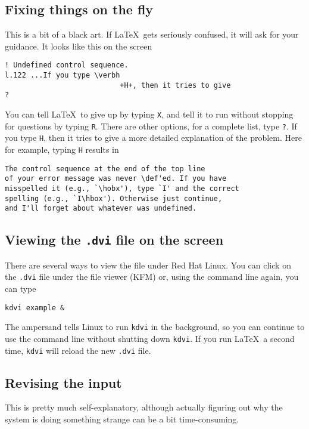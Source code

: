 \documentclass[12pt]{article}
\newcommand{\latex}{\LaTeX\ }
\begin{document}
\subsection{Fixing things on the fly}

This is a bit of a black art.
If \latex gets seriously confused, it will ask for your guidance.
It looks like this on the screen

\begin{verbatim}
! Undefined control sequence.
l.122 ...If you type \verbh
                           +H+, then it tries to give
? 
\end{verbatim}

You can tell \latex to give up by typing \verb+X+, and tell it to run
without stopping for questions by typing \verb+R+.
There are other options, for a complete list, type \verb+?+.
If you type \texttt{H}, then it tries to give a more detailed
explanation of the problem.  Here for example, typing \texttt{H}
results in

\begin{verbatim}
The control sequence at the end of the top line
of your error message was never \def'ed. If you have
misspelled it (e.g., `\hobx'), type `I' and the correct
spelling (e.g., `I\hbox'). Otherwise just continue,
and I'll forget about whatever was undefined.
\end{verbatim}

\subsection{Viewing the \texttt{.dvi} file on the screen}

There are several ways to view the file under Red Hat Linux.
You can click on the \texttt{.dvi} file under the file viewer
(KFM) or, using the command line again, you can type

\begin{verbatim}
kdvi example &
\end{verbatim}

The ampersand tells Linux to run \texttt{kdvi} in the background,
so you can continue to use the command line without shutting down
\texttt{kdvi}.
If you run \latex a second time, \texttt{kdvi} will reload the 
new \texttt{.dvi} file.

\subsection{Revising the input}

This is pretty much self-explanatory, although actually figuring
out why the system is doing something strange can be a bit
time-consuming.
\end{document}
